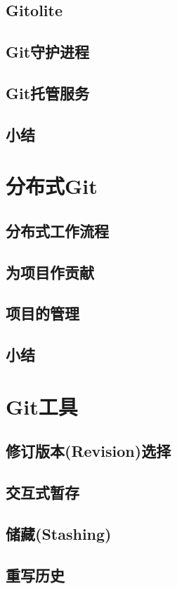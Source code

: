 \documentclass{book}
\begin{document}
	\section{Gitolite}
	\section{Git守护进程}
	\section{Git托管服务}
	\section{小结}

\chapter{分布式Git}
	\section{分布式工作流程}
	\section{为项目作贡献}
	\section{项目的管理}
	\section{小结}

\chapter{Git工具}
	\section{修订版本(Revision)选择}
	\section{交互式暂存}
	\section{储藏(Stashing)}
	\section{重写历史}
\end{document}
